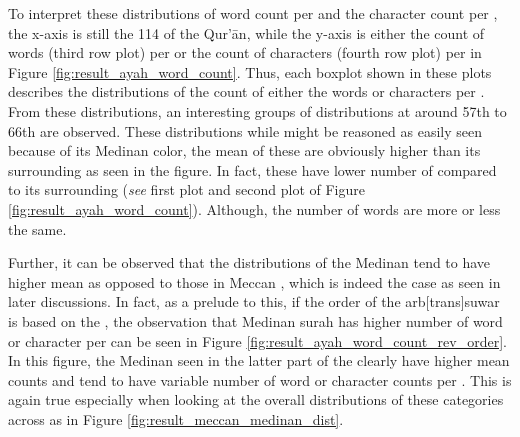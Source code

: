 To interpret these distributions of word count per   and the character count per  , the x-axis is still the 114   of the Qur'\=an, while the y-axis is either the count of words (third row plot) per   or the count of characters (fourth row plot) per   in Figure \ref{fig:result_ayah_word_count}. Thus, each boxplot shown in these plots describes the distributions of the count of either the words or characters per  . From these distributions, an interesting groups of distributions at around 57th   to 66th   are observed. These distributions while might be reasoned as easily seen because of its Medinan   color, the mean of these are obviously higher than its surrounding   as seen in the figure. In fact, these   have lower number of   compared to its surrounding   (\textit{see} first plot and second plot of Figure \ref{fig:result_ayah_word_count}). Although, the number of words are more or less the same.

Further, it can be observed that the distributions of the Medinan   tend to have higher mean as opposed to those in Meccan  , which is indeed the case as seen in later discussions. In fact, as a prelude to this, if the order of the arb[trans]{suwar}  is based on the  , the observation that Medinan surah has higher number of word or character per   can be seen in Figure \ref{fig:result_ayah_word_count_rev_order}. In this figure, the Medinan   seen in the latter part of the   clearly have higher mean counts and tend to have variable number of word or character counts per  . This is again true especially when looking at the overall distributions of these categories across   as in Figure \ref{fig:result_meccan_medinan_dist}.

